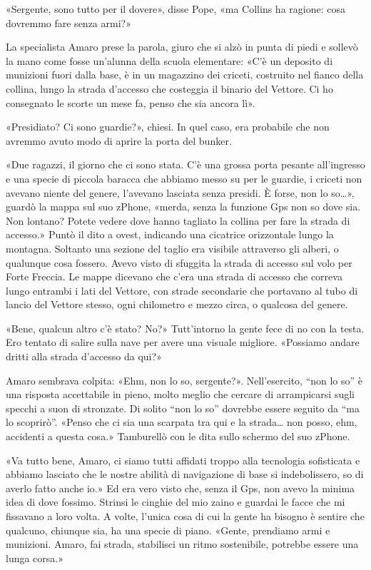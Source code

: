 «Sergente, sono tutto per il dovere», disse Pope, «ma Collins ha
ragione: cosa dovremmo fare senza armi?»

La specialista Amaro prese la parola, giuro che si alzò in punta di
piedi e sollevò la mano come fosse un'alunna della scuola elementare:
«C'è un deposito di munizioni fuori dalla base, è in un magazzino dei
criceti, costruito nel fianco della collina, lungo la strada d'accesso
che costeggia il binario del Vettore. Ci ho consegnato le scorte un mese
fa, penso che sia ancora lì».

«Presidiato? Ci sono guardie?», chiesi. In quel caso, era probabile che
non avremmo avuto modo di aprire la porta del bunker.

«Due ragazzi, il giorno che ci sono stata. C'è una grossa porta pesante
all'ingresso e una specie di piccola baracca che abbiamo messo su per le
guardie, i criceti non avevano niente del genere, l'avevano lasciata
senza presidi. È forse, non lo so\ldots», guardò la mappa sul suo
zPhone, «merda, senza la funzione Gps non so dove sia. Non lontano?
Potete vedere dove hanno tagliato la collina per fare la strada di
accesso.» Puntò il dito a ovest, indicando una cicatrice orizzontale
lungo la montagna. Soltanto una sezione del taglio era visibile
attraverso gli alberi, o qualunque cosa fossero. Avevo visto di sfuggita
la strada di accesso sul volo per Forte Freccia. Le mappe dicevano che
c'era una strada di accesso che correva lungo entrambi i lati del
Vettore, con strade secondarie che portavano al tubo di lancio del
Vettore stesso, ogni chilometro e mezzo circa, o qualcosa del genere.

«Bene, qualcun altro c'è stato? No?» Tutt'intorno la gente fece di no
con la testa. Ero tentato di salire sulla nave per avere una visuale
migliore. «Possiamo andare dritti alla strada d'accesso da qui?»

Amaro sembrava colpita: «Ehm, non lo so, sergente?». Nell'esercito,
``non lo so'' è una risposta accettabile in pieno, molto meglio che
cercare di arrampicarsi sugli specchi a suon di stronzate. Di solito
``non lo so'' dovrebbe essere seguito da ``ma lo scoprirò''. «Penso che
ci sia una scarpata tra qui e la strada\ldots{} non posso, ehm,
accidenti a questa cosa.» Tamburellò con le dita sullo schermo del suo
zPhone.

«Va tutto bene, Amaro, ci siamo tutti affidati troppo alla tecnologia
sofisticata e abbiamo lasciato che le nostre abilità di navigazione di
base si indebolissero, so di averlo fatto anche io.» Ed era vero visto
che, senza il Gps, non avevo la minima idea di dove fossimo. Strinsi le
cinghie del mio zaino e guardai le facce che mi fissavano a loro volta.
A volte, l'unica cosa di cui la gente ha bisogno è sentire che qualcuno,
chiunque sia, ha una specie di piano. «Gente, prendiamo armi e
munizioni. Amaro, fai strada, stabilisci un ritmo sostenibile, potrebbe
essere una lunga corsa.»

